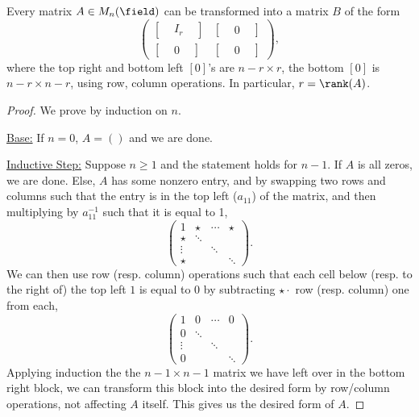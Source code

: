 \begin{theorem}\label{thm:blockformable}
    Every matrix $A \in M_{n}(\field)$ can be transformed into a matrix $B$ of the form \[
    \begin{pmatrix}
        \begin{bmatrix}
           &I_r &
        \end{bmatrix} & \begin{bmatrix}
            & 0 & 
        \end{bmatrix}\\
        \begin{bmatrix}
            & 0 &
        \end{bmatrix} & \begin{bmatrix}
            & 0 &
        \end{bmatrix}
    \end{pmatrix}, 
    \]
    where the top right and bottom left $[0]$'s are $n - r \times r$, the bottom $[0]$ is $n - r \times n - r$, using row, column operations. In particular, $r = \rank(A)$.
\end{theorem}
\begin{proof}
    We prove by induction on $n$. 
    
    \underline{Base:} If $n = 0$, $A = ()$ and we are done.

    \underline{Inductive Step:} Suppose $n \geq 1$ and the statement holds for $n - 1$. If $A$ is all zeros, we are done. Else, $A$ has some nonzero entry, and by swapping two rows and columns such that the entry is in the top left ($a_11$) of the matrix, and then multiplying by $a_11^{-1}$ such that it is equal to 1, \[
    \begin{pmatrix}
        1 & \star & \cdots & \star\\
        \star & \ddots & & \\
        \vdots & & \ddots &\\
        \star & & & \ddots
    \end{pmatrix}.
    \]
    We can then use row (resp. column) operations such that each cell below (resp. to the right of) the top left $1$ is equal to $0$ by subtracting $\star \cdot $ row (resp. column) one from each,
    \[
        \begin{pmatrix}
            1 & 0 & \cdots & 0\\
            0 & \ddots & & \\
            \vdots & & \ddots &\\
            0 & & & \ddots
        \end{pmatrix}.
        \]
        Applying induction the the $n - 1 \times n - 1$ matrix we have left over in the bottom right block, we can transform this block into the desired form by row/column operations, not affecting $A$ itself. This gives us the desired form of $A$.
\end{proof}

